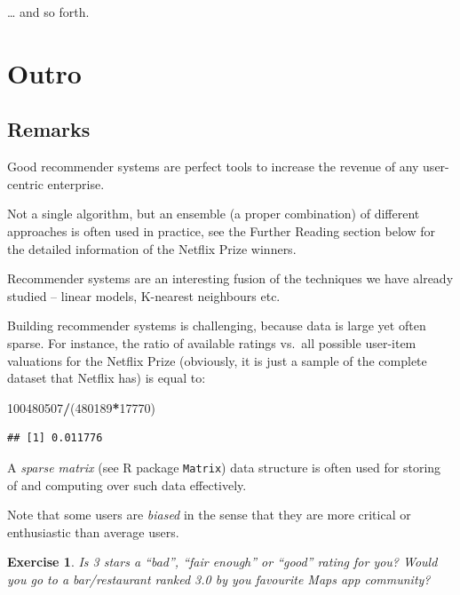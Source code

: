 \documentclass[10pt,b5paper,krantz1]{krantz}
\newenvironment{Shaded}{\begin{snugshade}}{\end{snugshade}}
\newcommand{\DecValTok}[1]{\textcolor[rgb]{0.06,0.06,0.06}{#1}}
\newcommand{\NormalTok}[1]{#1}
\newcommand{\OperatorTok}[1]{\textcolor[rgb]{0.43,0.43,0.43}{\textbf{#1}}}
\newtheorem{exercise}{Exercise}[chapter]
\begin{document}
\ldots{} and so forth.

\hypertarget{outro-8}{%
\section{Outro}\label{outro-8}}

\hypertarget{remarks-8}{%
\subsection{Remarks}\label{remarks-8}}

Good recommender systems are perfect tools to increase the revenue
of any user-centric enterprise.

Not a single algorithm, but an ensemble (a proper combination) of different approaches
is often used in practice, see the Further Reading section below for the detailed
information of the Netflix Prize winners.

Recommender systems are an interesting fusion of the techniques we
have already studied -- linear models, K-nearest neighbours etc.

Building recommender systems is challenging, because
data is large yet often sparse.
For instance, the ratio of available ratings
vs.~all possible user-item valuations for the Netflix Prize
(obviously, it is just a sample of
the complete dataset that Netflix has) is equal to:

\begin{Shaded}
\begin{Highlighting}[]
\DecValTok{100480507}\OperatorTok{/}\NormalTok{(}\DecValTok{480189}\OperatorTok{*}\DecValTok{17770}\NormalTok{)}
\end{Highlighting}
\end{Shaded}

\begin{verbatim}
## [1] 0.011776
\end{verbatim}

A \emph{sparse matrix} (see R package \texttt{Matrix}) data structure is
often used for storing of and computing over such data effectively.

Note that some users are \emph{biased} in the sense that they are more critical or
enthusiastic than
average users.

\begin{exercise}

Is 3 stars a ``bad'', ``fair enough'' or ``good'' rating for you?
Would you go to a bar/restaurant ranked 3.0 by you favourite Maps app community?

\end{exercise}
\end{document}
